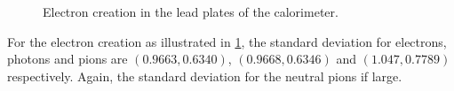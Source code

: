 \begin{figure}[htb!]
  \hspace{1em}


  \caption{Electron creation in the lead plates of the calorimeter.}\label{fig:electrons-creation-lead}


\end{figure}

For the electron creation as illustrated in \cref{fig:electrons-creation-lead},
the standard deviation for electrons, photons and pions are \((0.9663,
0.6340)\), \((0.9668, 0.6346)\) and \((1.047, 0.7789)\) respectively. Again,
the standard deviation for the neutral pions if large.

